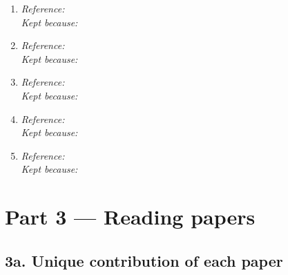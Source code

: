 \begin{enumerate}
  \item \textit{Reference:} \underline{\hspace{10cm}} \\[4pt]
        \textit{Kept because:} \underline{\hspace{10cm}}
  \vspace{0.4cm}
  \item \textit{Reference:} \underline{\hspace{10cm}} \\[4pt]
        \textit{Kept because:} \underline{\hspace{10cm}}
  \vspace{0.4cm}
  \item \textit{Reference:} \underline{\hspace{10cm}} \\[4pt]
        \textit{Kept because:} \underline{\hspace{10cm}}
  \vspace{0.4cm}
  \item \textit{Reference:} \underline{\hspace{10cm}} \\[4pt]
        \textit{Kept because:} \underline{\hspace{10cm}}
  \vspace{0.4cm}
  \item \textit{Reference:} \underline{\hspace{10cm}} \\[4pt]
        \textit{Kept because:} \underline{\hspace{10cm}}
\end{enumerate}


\section*{Part 3 — Reading papers}

\subsection*{3a. Unique contribution of each paper}



